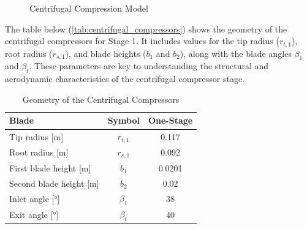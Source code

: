 \documentclass{Format}
\begin{document}
\begin{figure}[H]
    \caption{Centrifugal Compression Model}
    \label{fig:Centcomp}
    \end{figure}
The table below (\autoref{tab:centrifugal_compressors}) shows the geometry of the centrifugal compressors for Stage 1. It includes values for the tip radius ($r_{t,1}$), root radius ($r_{s,1}$), and blade heights ($b_1$ and $b_2$), along with the blade angles $\beta_1$ and $\beta_t$. These parameters are key to understanding the structural and aerodynamic characteristics of the centrifugal compressor stage.

\begin{table}[h!]
    \centering
    \begin{tabular}{|l|c|c|}
        \hline
        \textbf{Blade} & \textbf{Symbol} & \textbf{One-Stage} \\
        \hline
        Tip radius [m] & $r_{t,1}$ & 0.117 \\
        Root radius [m] & $r_{s,1}$ & 0.092 \\
        First blade height [m] & $b_1$ & 0.0201 \\
        Second blade height [m] & $b_2$ & 0.02 \\
        Inlet angle [°] & $\beta_1$ & 38 \\
        Exit angle [°] & $\beta_t$ & 40 \\
        \hline
    \end{tabular}
    \caption{Geometry of the Centrifugal Compressors}
    \label{tab:centrifugal_compressors}
\end{table}
\end{document}
